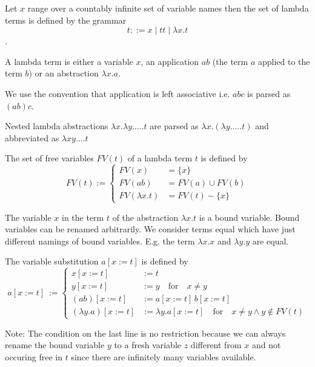 \documentclass{article}
\begin{document}
\begin{definition}
  Let $x$ range over a countably infinite set of variable names then the set
  of lambda terms is defined by the grammar $$t ::= x \mid t t \mid \lambda x. t$$.
\end{definition}

A lambda term is either a variable $x$, an application $a b$ (the term $a$
applied to the term $b$) or an abstraction $\lambda x.a$.

We use the convention that application is left associative i.e. $a b c$ is
parsed as $(a b) c$.

Nested lambda abstractions $\lambda x. \lambda y. \ldots . t$ are parsed as
$\lambda x. (\lambda y. \ldots . t)$ and abbreviated as $\lambda x y \ldots . t$

\begin{definition}
  The set of free variables $FV(t)$ of a lambda term $t$ is defined by
  $$FV(t) :=
  \begin{cases} FV(x) &= \{x\} \\
     FV(a b) &= FV(a) \cup FV(b) \\
     FV(\lambda x. t) &= FV(t) - \{x\}
   \end{cases}
   $$
\end{definition}

The variable $x$ in the term $t$ of the abstraction $\lambda x.t$ is a bound
variable. Bound variables can be renamed arbitrarily. We consider terms equal
which have just different namings of bound variables. E.g. the term $\lambda
x.x$ and $\lambda y.y$ are equal.

\begin{definition}
  The variable substitution $a[x:=t]$ is defined by
  $$a[x:=t]~:=
  \begin{cases} x[x:=t]  &:= t \\
    y[x:=t] &:= y \quad \text{for}\quad x \ne y \\
    (a b)[x:=t] &:= a[x:=t] \, b[x:=t] \\
    (\lambda y.a)[x:=t]  &:= \lambda y. a[x:=t] \quad\text{for}\quad x \ne y
    \land y \notin FV(t)
   \end{cases}
   $$
\end{definition}

Note: The condition on the last line is no restriction because we can always
rename the bound variable $y$ to a fresh variable $z$ different from $x$ and
not occuring free in $t$ since there are infinitely many variables available.
\end{document}
